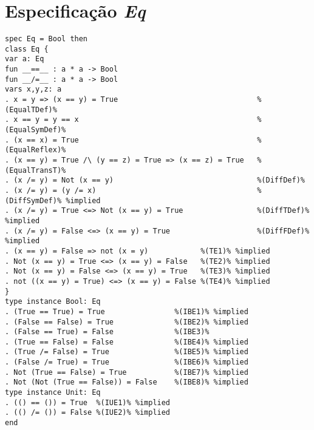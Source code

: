 \section{Especificação \textit{Eq}}
\label{appendix:strictSpec:eq}
\begin{Verbatim}
spec Eq = Bool then
class Eq {
var a: Eq
fun __==__ : a * a -> Bool
fun __/=__ : a * a -> Bool
vars x,y,z: a
. x = y => (x == y) = True                                %(EqualTDef)%
. x == y = y == x                                         %(EqualSymDef)%
. (x == x) = True                                         %(EqualReflex)%
. (x == y) = True /\ (y == z) = True => (x == z) = True   %(EqualTransT)%
. (x /= y) = Not (x == y)                                 %(DiffDef)%
. (x /= y) = (y /= x)                                     %(DiffSymDef)% %implied
. (x /= y) = True <=> Not (x == y) = True                 %(DiffTDef)% %implied
. (x /= y) = False <=> (x == y) = True                    %(DiffFDef)% %implied
. (x == y) = False => not (x = y)            %(TE1)% %implied
. Not (x == y) = True <=> (x == y) = False   %(TE2)% %implied
. Not (x == y) = False <=> (x == y) = True   %(TE3)% %implied
. not ((x == y) = True) <=> (x == y) = False %(TE4)% %implied
}
type instance Bool: Eq
. (True == True) = True                %(IBE1)% %implied
. (False == False) = True              %(IBE2)% %implied
. (False == True) = False              %(IBE3)%
. (True == False) = False              %(IBE4)% %implied
. (True /= False) = True               %(IBE5)% %implied
. (False /= True) = True               %(IBE6)% %implied
. Not (True == False) = True           %(IBE7)% %implied
. Not (Not (True == False)) = False    %(IBE8)% %implied
type instance Unit: Eq
. (() == ()) = True  %(IUE1)% %implied
. (() /= ()) = False %(IUE2)% %implied
end
\end{Verbatim}


